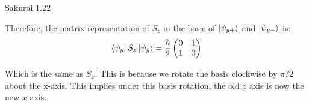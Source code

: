 \documentclass{article}
\begin{document}
\begin{section}{Sakurai 1.22}
\begin{enumerate}
\begin{tcolorbox}
		Therefore, the matrix representation of $S_z$ in the basis of $\ket{\psi_{y+}}$ and $\ket{\psi_{y-}}$ is:
		\begin{align*}
			\bra{\psi_y}S_z\ket{\psi_y} = \frac{\hbar}{2}
			\begin{pmatrix}
				0 & 1 \\
				1 & 0
			\end{pmatrix}
		\end{align*}

		Which is the same as $S_x$. This is because we rotate the basis clockwise by $\pi/2$ about the x-axis. This implies under this basis rotation, the old $z$ axis is now the new $x$ axis.
	\end{tcolorbox}
\end{enumerate}
\end{section}
\end{document}
